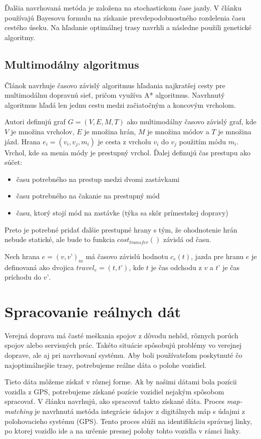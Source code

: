 Ďalšia navrhovaná metóda je založena na stochastickom čase jazdy. V článku \cite{stochastic} používajú Bayesovu formulu na získanie prevdepodobnostného rozdelenia času cestého úseku. Na hľadanie optimálnej trasy navrhli a následne použili genetické algoritmy.

\subsection{Multimodálny algoritmus}
Článok \cite{timedependent} navrhuje časovo závislý algoritmus hľadania najkratšej cesty pre multimodálnu dopravnú sieť, pričom využíva A* algoritmus. Navrhnutý algoritmus hľadá len jednu cestu medzi začiatočným a koncovým vrcholom. 

Autori definujú graf $G = (V, E, M, T)$ ako multimodálny časovo závislý graf, kde $V$ je množina vrcholov, $E$ je množina hrán, $M$ je množina módov a $T$ je množina jázd.
Hrana $e_i = (v_i, v_j, m_i)$ je cesta z vrcholu $v_i$ do $v_j$ použitím módu $m_i$. Vrchol, kde sa menia módy je prestupný vrchol. Ďalej definujú čas prestupu ako súčet:
\begin{itemize}
\item{času potrebného na prestup medzi dvomi zastávkami}
\item{času potrebného na čakanie na prestupný mód}
\item{času, ktorý stojí mód na zastávke (týka sa skôr prímestskej dopravy)}
\end{itemize}

Preto je potrebné pridať ďalšie prestupné hrany s tým, že ohodnotenie hrán nebude statické, ale bude to funkcia $cost_{transfer}()$ závislá od času.

Nech hrana $e = (v, v’)_m$ má časovo závislú hodnotu $c_e(t)$, jazda pre hranu $e$ je definovaná ako dvojica $travel_e = (t, t’)$, kde $t$ je čas odchodu z $v$ a $t’$ je čas príchodu do $v’$.

\section{Spracovanie reálnych dát}
\label{sec:models}
Verejná doprava má časté meškania spojov z dôvodu nehôd, rôznych porúch spojov alebo servisných prác. Takéto situácie spôsobujú problémy vo verejnej doprave, ale aj pri navrhovaní systému. Aby boli používateľom poskytnuté čo najoptimálnejšie trasy, potrebujeme reálne dáta o polohe vozidiel.

Tieto dáta môžeme získať v rôznej forme. Ak by našimi dátami bola pozícii vozidla z GPS, potrebujeme získané pozície vozidiel nejakým spôsobom spracovať. V článku \cite{mapmatching} navrhujú, ako spracovať takto získané dáta. Proces \textit{map-matching} je navrhnutá metóda integrácie údajov z digitálnych máp s údajmi z polohovacieho systému (GPS). Tento proces slúži na identifikáciu správnej linky, po ktorej vozidlo ide a na určenie presnej polohy tohto vozidla v rámci linky.

